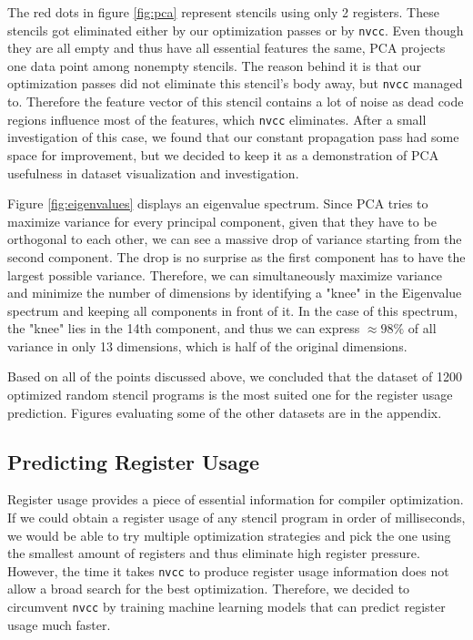 \documentclass[sigplan,\review anonymous]{acmart}
\begin{document}
The red dots in figure \ref{fig:pca} represent stencils using only 2 registers.
These stencils got eliminated either by our optimization passes or by
\texttt{nvcc}. Even though they are all empty and thus have all essential
features the same, PCA projects one data point among nonempty stencils. The
reason behind it is that our optimization passes did not eliminate this
stencil's body away, but \texttt{nvcc} managed to. Therefore the feature
vector of this stencil contains a lot of noise as dead code regions influence
most of the features, which \texttt{nvcc} eliminates. After a small
investigation of this case, we found that our constant propagation pass had
some space for improvement, but we decided to keep it as a demonstration of
PCA usefulness in dataset visualization and investigation.

Figure \ref{fig:eigenvalues} displays an eigenvalue spectrum. Since PCA tries
to maximize variance for every principal component, given that they have to
be orthogonal to each other, we can see a massive drop of variance starting
from the second component. The drop is no surprise as the first component
has to have the largest possible variance. Therefore, we can simultaneously
maximize variance and minimize the number of dimensions by identifying a
"knee" in the Eigenvalue spectrum and keeping all components in front of it.
In the case of this spectrum, the "knee" lies in the 14th component, and thus
we can express $\approx 98\%$ of all variance in only 13 dimensions, which is
half of the original dimensions.

Based on all of the points discussed above, we concluded that the dataset of
1200 optimized random stencil programs is the most suited one for the register
usage prediction. Figures evaluating some of the other datasets are in the
appendix.

\subsection{Predicting Register Usage}

Register usage provides a piece of essential information for compiler
optimization. If we could obtain a register usage of any stencil program in
order of milliseconds, we would be able to try multiple optimization
strategies and pick the one using the smallest amount of registers and thus
eliminate high register pressure. However, the time it takes \texttt{nvcc}
to produce register usage information does not allow a broad search for the
best optimization. Therefore, we decided to circumvent \texttt{nvcc} by
training machine learning models that can predict register usage much faster.
\end{document}
